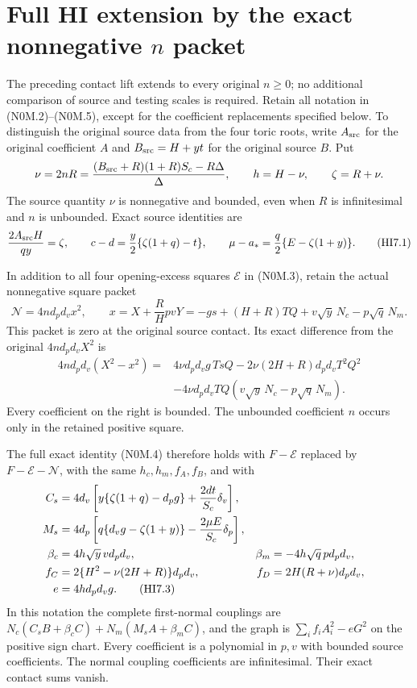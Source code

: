 \section{Full HI extension by the exact nonnegative \texorpdfstring{$n$}{n} packet}
\label{sec:r7-hi-full-retained}
The preceding contact lift extends to every original $n\geq0$; no
additional comparison of source and testing scales is required. Retain
all notation in (N0M.2)--(N0M.5), except for the coefficient replacements
specified below. To distinguish the original source data from the four
toric roots, write $A_{\rm src}$ for the original coefficient $A$ and
$B_{\rm src}=H+yt$ for the original source $B$. Put
\[
 \nu=2nR=\frac{(B_{\rm src}+R)(1+R)S_c-R\Delta}{\Delta},
 \qquad h=H-\nu,\qquad \zeta=R+\nu.
\]
The source quantity $\nu$ is nonnegative and bounded, even when $R$ is
infinitesimal and $n$ is unbounded. Exact source identities are
\[
 \frac{2A_{\rm src}H}{qy}=\zeta,\qquad
 c-d=\frac y2\{\zeta(1+q)-t\},\qquad
 \mu-a_*=\frac q2\{E-\zeta(1+y)\}.             \tag{HI7.1}
\]

In addition to all four opening-excess squares $\mathcal E$ in
(N0M.3), retain the actual nonnegative square packet
\[
 \mathcal N=4nd_pd_vx^2,\qquad
 x=X+\frac RHpvY
   =-g s+(H+R)TQ+v\sqrt y\,N_c-p\sqrt q\,N_m.
                                                               \tag{HI7.2}
\]
This packet is zero at the original source contact. Its exact difference
from the original $4nd_pd_vX^2$ is
\begin{align*}
 4nd_pd_v(X^2-x^2)={}&4\nu d_pd_vg\,TsQ
 -2\nu(2H+R)d_pd_vT^2Q^2\\
 &-4\nu d_pd_vTQ(v\sqrt y\,N_c-p\sqrt q\,N_m).
\end{align*}
Every coefficient on the right is bounded. The unbounded coefficient
$n$ occurs only in the retained positive square.

The full exact identity (N0M.4) therefore holds with
$F-\mathcal E$ replaced by $F-\mathcal E-\mathcal N$, with the same
$h_c,h_m,f_A,f_B$, and with
\begin{align}
 C_s&=4d_v\left[y\{\zeta(1+q)-d_pg\}
                       +\frac{2dt}{S_c}\delta_v\right],\notag\\
 M_s&=4d_p\left[q\{d_vg-\zeta(1+y)\}
                       -\frac{2\mu E}{S_c}\delta_p\right],\notag\\
 \beta_c&=4h\sqrt y\,v d_pd_v,
 &\beta_m&=-4h\sqrt q\,p d_pd_v,\notag\\
 f_C&=2\{H^2-\nu(2H+R)\}d_pd_v,
 &f_D&=2H(R+\nu)d_pd_v,\notag\\
 e&=4h d_pd_vg.                                  \tag{HI7.3}
\end{align}
In this notation the complete first-normal couplings are
$N_c(C_sB+\beta_cC)+N_m(M_sA+\beta_mC)$, and the graph is
$\sum_i f_iA_i^2-eG^2$ on the positive sign chart. Every coefficient
is a polynomial in $p,v$ with bounded source coefficients. The normal
coupling coefficients are infinitesimal. Their exact contact sums vanish.

